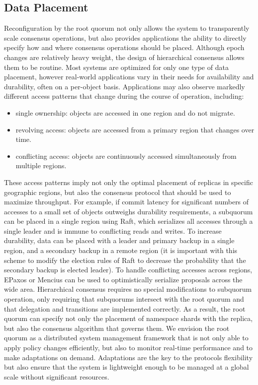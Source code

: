 \documentclass[10pt,conference]{IEEEtran}
\newcommand{\hc}{hierarchical consensus\xspace}
\newcommand{\Hc}{Hierarchical consensus\xspace}
\newcommand{\sub}{subquorum\xspace}
\newcommand{\subs}{subquorums\xspace}
\newcommand{\roo}{root quorum\xspace}
\begin{document}
\subsection{Data Placement}
\label{section:placement}


Reconfiguration by the \roo not only allows the system to transparently scale consensus
operations, but also provides applications the ability to directly specify how and where
consensus operations should be placed.
Although epoch changes are relatively heavy weight, the design of \hc allows them to be
routine.
Most systems are optimized for only one type of data placement, however real-world
applications vary in their needs for availability and durability, often on a per-object
basis.
Applications may also observe markedly different access patterns that change during the
course of operation, including:

\begin{itemize}
    \item single ownership: objects are accessed in one region and do not migrate.
    \item revolving access: objects are accessed from a primary region that changes over time.
    \item conflicting access: objects are continuously accessed simultaneously from multiple regions.
\end{itemize}

These access patterns imply not only the optimal placement of replicas in specific
geographic regions, but also the consensus protocol that should be used to maximize
throughput.
For example, if commit latency for significant numbers of accesses to a small set of
objects outweighs durability requirements, a \sub can be placed in a single region using
Raft, which serializes all accesses through a single leader and is immune to conflicting
reads and writes.
To increase durability, data can be placed with a leader and primary backup in a single
region, and a secondary backup in a remote region (it is important with this scheme to
modify the election rules of Raft to decrease the probability that the secondary backup
is elected leader).
To handle conflicting accesses across regions, EPaxos or Mencius can be used to
optimistically serialize proposals across the wide area.
\Hc requires no special modifications to \sub operation, only requiring that \subs
intersect with the \roo and that delegation and transitions are implemented correctly.
As a result, the \roo can specify not only the placement of namespace shards with the
replica, but also the consensus algorithm that governs them.
We envision the \roo as a distributed system management framework that is not only able
to apply policy changes efficiently, but also to monitor real-time performance and to
make adaptations on demand.
Adaptations are the key to the protocols flexibility but also ensure that the system is
lightweight enough to be managed at a global scale without significant resources.
\end{document}
